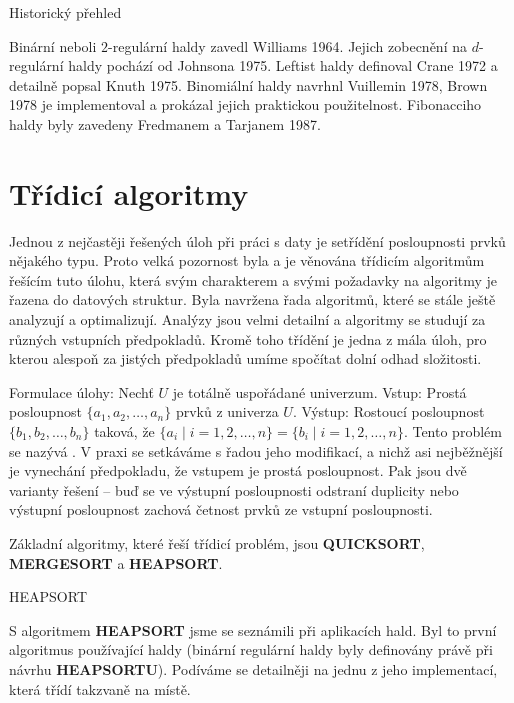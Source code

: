 \documentclass[a4paper,12pt]{article}
\def \emph#1{\underbar{#1}}
\begin{document}
\head
Historický přehled
\endhead

Binární neboli $2$-regulární haldy 
zavedl Williams 1964.  Jejich zobecnění na $d$-regulární haldy 
pochází od Johnsona 1975.  Leftist haldy definoval Crane 1972 a 
detailně popsal Knuth 1975.  Binomiální haldy navrhnl Vuillemin 
1978, Brown 1978 je implementoval a prokázal jejich praktickou 
použitelnost.  Fibonacciho haldy byly zavedeny Fredmanem a 
Tarjanem 1987.  
\newpage

\section{{Třídicí algoritmy}}

Jednou z nejčastěji řešených úloh při práci s 
daty je setřídění 
posloupnosti prvků nějakého typu. Proto velká pozornost byla a je věnována 
třídicím algoritmům řešícím tuto úlohu, která 
svým charakterem a svými 
požadavky na algoritmy je řazena do datových 
struktur. Byla navržena řada algoritmů, které se 
stále ještě analyzují a optimalizují. Analýzy jsou velmi detailní a algoritmy se 
studují za různých vstupních předpokladů. 
Kromě toho třídění je jedna z mála úloh, pro kterou 
alespoň za jistých 
předpokladů umíme spočítat dolní odhad složitosti.

Formulace úlohy:\newline 
Nechť $U$ je totálně uspořádané univerzum.\newline 
Vstup: Prostá posloupnost $\{a_1,a_2,\dots,a_n\}$ prvků z 
univerza $U$.\newline 
Výstup: Rostoucí posloupnost $\{b_1,b_2,\dots,b_n\}$ taková, že 
$\{a_i\mid i=1,2,\dots,n\}=\{b_i\mid i=1,2,\dots,n\}$.\newline 
Tento problém se nazývá \emph{třídění}. 
V praxi se setkáváme s řadou jeho modifikací, a nichž 
asi nejběžnější je vynechání předpokladu, že 
vstupem je prostá posloupnost. Pak jsou dvě varianty 
řešení -- bu\v d se ve výstupní posloupnosti odstraní 
duplicity nebo výstupní posloupnost zachová četnost prvků ze 
vstupní posloupnosti.

Základní algoritmy, které  řeší třídicí 
problém, jsou {\bf QUICKSORT}, {\bf MERGESORT} a {\bf HEAP\-SORT}. 

\head
HEAPSORT
\endhead

S algoritmem {\bf HEAPSORT} jsme se seznámili při 
aplikacích hald.  Byl to první algoritmus používající haldy 
(binární regulár\-ní haldy byly definovány právě při návrhu 
{\bf HEAP\-SORTU}).  Podíváme se detailněji na jednu z jeho 
implementací, která třídí takzvaně na místě. 
\end{document}
